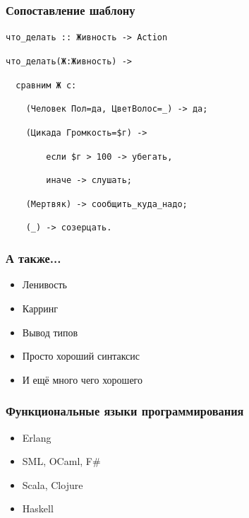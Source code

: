 \documentclass{beamer}
\begin{document}
\begin{frame}[fragile]
  \frametitle{Сопоставление шаблону}
  \begin{block}{}
    \texttt{{\color{red}что\_делать} :: {\color{blue}Живность} -> {\color{blue}Action}}
    \pause

    \texttt{{\color{red}что\_делать}(Ж:{\color{blue}Живность}) ->}

    \verb+  +\texttt{{\color{magenta}сравним} Ж {\color{magenta}с}:}
    \pause

    \verb+    +\texttt{({\color{blue}Человек} Пол={\color{red}да}, ЦветВолос=\_) -> {\color{red}да};}
    \pause

    \verb+    +\texttt{({\color{blue}Цикада} Громкость=\$г) ->}

    \verb+        +\texttt{{\color{magenta}если} \$г > 100 -> {\color{red}убегать},}

    \verb+        +\texttt{{\color{magenta}иначе} -> {\color{red}слушать};}
    \pause

    \verb+    +\texttt{({\color{blue}Мертвяк}) -> {\color{red}сообщить\_куда\_надо};}
    \pause

    \verb+    +\texttt{(\_) -> {\color{red}созерцать}.}
  \end{block}
\end{frame}

\begin{frame}
  \frametitle{А также...}
  \begin{itemize}
  \item Ленивость
    \pause
  \item Карринг
    \pause
  \item Вывод типов
    \pause
  \item Просто хороший синтаксис
    \pause
  \item И ещё много чего хорошего
  \end{itemize}
\end{frame}

\begin{frame}
  \frametitle{Функциональные языки программирования}
  \begin{itemize}
  \item Erlang
    \pause
  \item SML, OCaml, F\#
    \pause
  \item Scala, Clojure
    \pause
  \item Haskell
  \end{itemize}
\end{frame}
\end{document}
